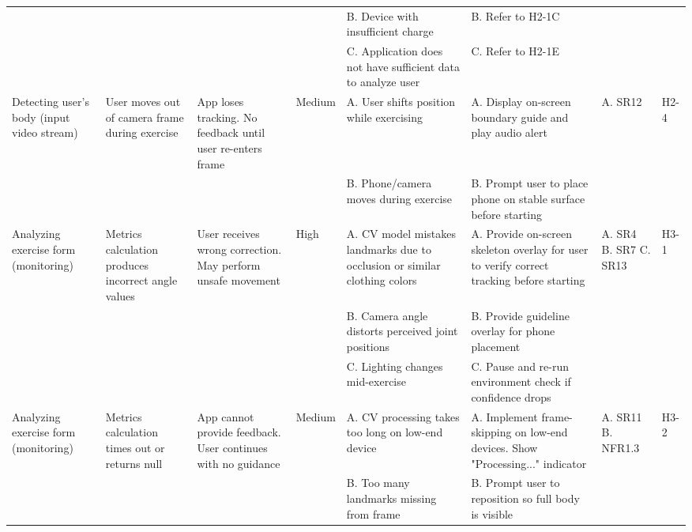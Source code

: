\documentclass{article}
\begin{document}
\begin{landscape}
\begin{center}
\begin{xltabular}{\linewidth}{
    L{1.6cm}  
    L{1.8cm}  
    L{2cm}    
    L{0.8cm}  
    L{2cm}    
    L{2.2cm}  
    L{1.3cm}  
    L{0.8cm}  
}
& & & & 
B. Device with insufficient charge & 
B. Refer to H2-1C & 
& \\

& & & & 
C. Application does not have sufficient data to analyze user & 
C. Refer to H2-1E & 
& \\


Detecting user's body (input video stream) & 
User moves out of camera frame during exercise & 
App loses tracking. No feedback until user re-enters frame & 
Medium & 
A. User shifts position while exercising & 
A. Display on-screen boundary guide and play audio alert & 
A. SR12 & 
H2-4 \\

& & & & 
B. Phone/camera moves during exercise & 
B. Prompt user to place phone on stable surface before starting & 
& \\


Analyzing exercise form (monitoring) & 
Metrics calculation produces incorrect angle values & 
User receives wrong correction. May perform unsafe movement & 
High & 
A. CV model mistakes landmarks due to occlusion or similar clothing colors & 
A. Provide on-screen skeleton overlay for user to verify correct tracking before starting & 
A. SR4 \newline
B. SR7 \newline
C. SR13 & 
H3-1 \\

& & & & 
B. Camera angle distorts perceived joint positions & 
B. Provide guideline overlay for phone placement & 
& \\

& & & & 
C. Lighting changes mid-exercise & 
C. Pause and re-run environment check if confidence drops & 
& \\


Analyzing exercise form (monitoring) & 
Metrics calculation times out or returns null & 
App cannot provide feedback. User continues with no guidance & 
Medium & 
A. CV processing takes too long on low-end device & 
A. Implement frame-skipping on low-end devices. Show "Processing..." indicator & 
A. SR11 \newline
B. NFR1.3 & 
H3-2 \\

& & & & 
B. Too many landmarks missing from frame & 
B. Prompt user to reposition so full body is visible & 
& \\


\end{xltabular}
\end{center}
\end{landscape}
\end{document}
